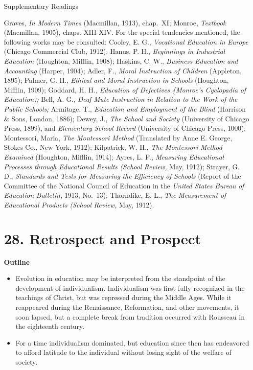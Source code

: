 \documentclass[
]{book}
\providecommand{\tightlist}{%
  \setlength{\itemsep}{0pt}\setlength{\parskip}{0pt}}
\begin{document}
Supplementary Readings

Graves, \emph{In Modern Times} (Macmillan, 1913), chap.~XI; Monroe, \emph{Textbook} (Macmillan, 1905), chaps. XIII-XIV. For the special tendencies mentioned, the following works may be consulted: Cooley, E. G., \emph{Vocational Education in Europe} (Chicago Commercial Club, 1912); Hanus, P. H., \emph{Beginnings in Industrial Education} (Houghton, Mifflin, 1908); Haskins, C. W., \emph{Business Education and Accounting} (Harper, 1904); Adler, F., \emph{Moral Instruction of Children} (Appleton, 1895); Palmer, G. H., \emph{Ethical and Moral Instruction in Schools} (Houghton, Mifflin, 1909); Goddard, H. H., \emph{Education of Defectives \{Monroe's Cyclopadia of Education);} Bell, A. G., \emph{Deaf Mute Instruction in Relation to the Work of the Public Schools;} Armitage, T., \emph{Education and Employment of the Blind} (Harrison \& Sons, London, 1886); Dewey, J., \emph{The School and Society} (University of Chicago Press, 1899), and \emph{Elementary School Record} (University of Chicago Press, 1000); Montessori, Maria, \emph{The Montessori Method} (Translated by Anne E. George, Stokes Co., New York, 1912); Kilpatrick, W. H., \emph{The Montessori Method Examined} (Houghton, Mifflin, 1914); Ayres, L. P., \emph{Measuring Educational Processes through Educational Results (School Review,} May, 1912); Strayer, G. D., \emph{Standards and Tests for Measuring the Efficiency of Schools} (Report of the Committee of the National Council of Education in the \emph{United States Bureau of Education Bulletin,} 1913, No.~13); Thorndike, E. L., \emph{The Measurement of Educational Products (School Review,} May, 1912).

\hypertarget{retrospect-and-prospect}{%
\chapter{28. Retrospect and Prospect}\label{retrospect-and-prospect}}

\textbf{Outline}

\begin{itemize}
\tightlist
\item
  Evolution in education may be interpreted from the standpoint of the development of individualism. Individualism was first fully recognized in the teachings of Christ, but was repressed during the Middle Ages. While it reappeared during the Renaissance, Reformation, and other movements, it soon lapsed, but a complete break from tradition occurred with Rousseau in the eighteenth century.
\item
  For a time individualism dominated, but education since then has endeavored to afford latitude to the individual without losing sight of the welfare of society.
\end{itemize}
\end{document}
